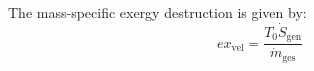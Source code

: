 The mass-specific exergy destruction is given by:  
\[
ex_{\text{vel}} = \frac{T_0 \dot{S}_{\text{gen}}}{\dot{m}_{\text{ges}}}
\]